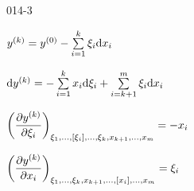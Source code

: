 \begin{mitframe}{014-3} %

    
\begin{listone}
        
    \item $y^{(k)}=y^{(\init)}-\sum\limits_{\state=1}^{k}\conjcoortwo_{\state}\mathrm{d}\conjcoor$
    
        
	\item $\mathrm{d}y^{(k)}=-\sum\limits_{\state=1}^{k}\conjcoor\mathrm{d}\conjcoortwo_{\state}+\sum\limits_{\state=k+1}^{m}\conjcoortwo_{\state}\mathrm{d}\conjcoor$ 
         
         
	\item $\bigg(\dfrac{\partial y^{(k)}}{\partial\conjcoortwo_{\state}}\bigg)_{\conjcoortwo_{1},...,[\conjcoortwo_{\state}],...,\conjcoortwo_{k},x_{k+1},...,x_{m}}=-\conjcoor$
    
    
	\item $\bigg(\dfrac{\partial y^{(k)}}{\partial\conjcoor}\bigg)_{\conjcoortwo_{1},...,\conjcoortwo_{k},x_{k+1},...,[x_{\state}],...,x_{m}}=\conjcoortwo_{\state}$
    
        
\end{listone}			

\end{mitframe}